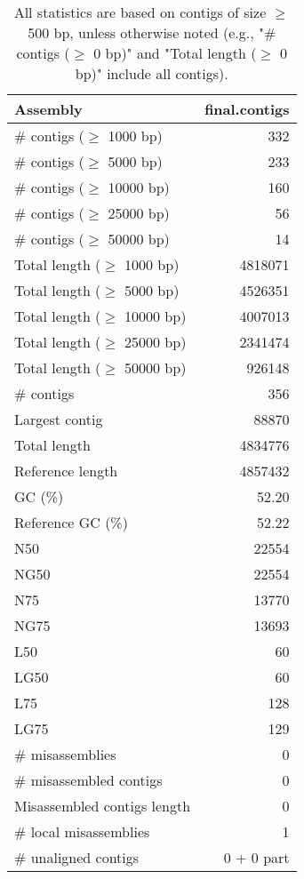 \documentclass[12pt,a4paper]{article}
\begin{document}
\begin{table}[ht]
\begin{center}
\caption{All statistics are based on contigs of size $\geq$ 500 bp, unless otherwise noted (e.g., "\# contigs ($\geq$ 0 bp)" and "Total length ($\geq$ 0 bp)" include all contigs).}
\begin{tabular}{|l*{1}{|r}|}
\hline
Assembly & final.contigs \\ \hline
\# contigs ($\geq$ 1000 bp) & 332 \\ \hline
\# contigs ($\geq$ 5000 bp) & 233 \\ \hline
\# contigs ($\geq$ 10000 bp) & 160 \\ \hline
\# contigs ($\geq$ 25000 bp) & 56 \\ \hline
\# contigs ($\geq$ 50000 bp) & 14 \\ \hline
Total length ($\geq$ 1000 bp) & 4818071 \\ \hline
Total length ($\geq$ 5000 bp) & 4526351 \\ \hline
Total length ($\geq$ 10000 bp) & 4007013 \\ \hline
Total length ($\geq$ 25000 bp) & 2341474 \\ \hline
Total length ($\geq$ 50000 bp) & 926148 \\ \hline
\# contigs & 356 \\ \hline
Largest contig & 88870 \\ \hline
Total length & 4834776 \\ \hline
Reference length & 4857432 \\ \hline
GC (\%) & 52.20 \\ \hline
Reference GC (\%) & 52.22 \\ \hline
N50 & 22554 \\ \hline
NG50 & 22554 \\ \hline
N75 & 13770 \\ \hline
NG75 & 13693 \\ \hline
L50 & 60 \\ \hline
LG50 & 60 \\ \hline
L75 & 128 \\ \hline
LG75 & 129 \\ \hline
\# misassemblies & 0 \\ \hline
\# misassembled contigs & 0 \\ \hline
Misassembled contigs length & 0 \\ \hline
\# local misassemblies & 1 \\ \hline
\# unaligned contigs & 0 + 0 part \\ \hline

\end{tabular}
\end{center}
\end{table}
\end{document}
